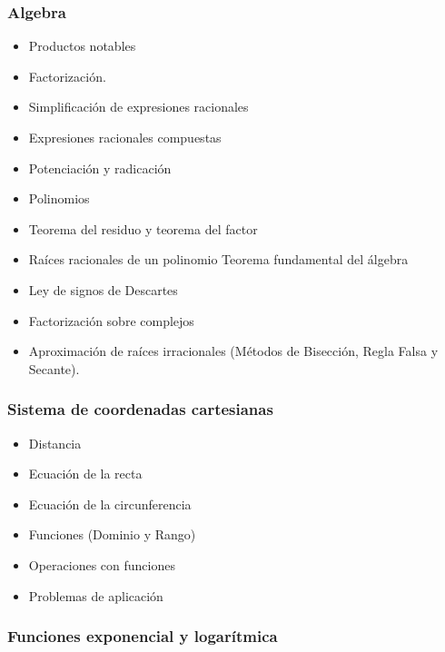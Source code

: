 \documentclass[]{book}
\providecommand{\tightlist}{%
  \setlength{\itemsep}{0pt}\setlength{\parskip}{0pt}}
\theoremstyle{definition}
\theoremstyle{definition}
\theoremstyle{definition}
\theoremstyle{remark}
\begin{document}
\hypertarget{algebra}{%
\subsubsection{\texorpdfstring{\textbf{Algebra}}{Algebra}}\label{algebra}}

\begin{itemize}
\tightlist
\item
  Productos notables
\item
  Factorización.
\item
  Simplificación de expresiones racionales
\item
  Expresiones racionales compuestas
\item
  Potenciación y radicación
\item
  Polinomios
\item
  Teorema del residuo y teorema del factor
\item
  Raíces racionales de un polinomio Teorema fundamental del álgebra
\item
  Ley de signos de Descartes
\item
  Factorización sobre complejos
\item
  Aproximación de raíces irracionales (Métodos de Bisección, Regla Falsa y Secante).
\end{itemize}

\hypertarget{sistema-de-coordenadas-cartesianas}{%
\subsubsection{\texorpdfstring{\textbf{Sistema de coordenadas cartesianas}}{Sistema de coordenadas cartesianas}}\label{sistema-de-coordenadas-cartesianas}}

\begin{itemize}
\tightlist
\item
  Distancia
\item
  Ecuación de la recta
\item
  Ecuación de la circunferencia
\item
  Funciones (Dominio y Rango)
\item
  Operaciones con funciones
\item
  Problemas de aplicación
\end{itemize}

\hypertarget{funciones-exponencial-y-logaruxedtmica}{%
\subsubsection{\texorpdfstring{\textbf{Funciones exponencial y logarítmica}}{Funciones exponencial y logarítmica}}\label{funciones-exponencial-y-logaruxedtmica}}
\end{document}
